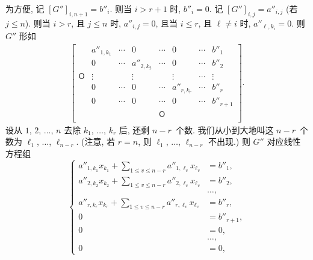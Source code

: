 \documentclass[../libro.tex]{subfiles}
\begin{document}
为方便, 记 \([G'']_{i,n+1} = b''_i\).
则当 \(i > r + 1\) 时, \(b''_i = 0\).
记 \([G'']_{i,j} = a''_{i,j}\)
(若 \(j \leq n\)).
则当 \(i > r\), 且 \(j \leq n\) 时,
\(a''_{i,j} = 0\),
且当 \(i \leq r\), 且 \(\ell \neq i\) 时,
\(a''_{\ell,k_i} = 0\).
则 \(G''\) 形如
\begin{align*}
    \begin{bmatrix}
        {}         & a''_{1,k_1} & \cdots & 0           & \cdots     & 0           & \cdots & b''_1     \\
        {}         & 0           & \cdots & a''_{2,k_2} & \cdots     & 0           & \cdots & b''_2     \\
        \mathsf{O} & \vdots      & {}     & \vdots      & {}         & \vdots      & \cdots & \vdots    \\
        {}         & 0           & \cdots & 0           & \cdots     & a''_{r,k_r} & \cdots & b''_r     \\
        {}         & 0           & \cdots & 0           & \cdots     & 0           & \cdots & b''_{r+1} \\
        {}         & {}          & {}     & {}          & \mathsf{O} & {}          & {}     & {}        \\
    \end{bmatrix}.
\end{align*}
设从 \(1\), \(2\), \(\dots\), \(n\)
去除 \(k_1\), \(\dots\), \(k_r\) 后,
还剩 \(n - r\)~个数.
我们从小到大地叫这 \(n - r\)~个数为
\(\ell_1\), \(\dots\), \(\ell_{n-r}\).
(注意, 若 \(r = n\), 则
    \(\ell_1\), \(\dots\), \(\ell_{n-r}\)
不出现.)
则 \(G''\) 对应线性方程组
\begin{equation}
    \left\{ %
    \begin{aligned}
        a''_{1,k_1} x_{k_1} + \sum_{1 \leq v \leq n-r} {a''_{1,\ell_v} x_{\ell_v}} & = b''_1,     \\
        a''_{2,k_2} x_{k_2} + \sum_{1 \leq v \leq n-r} {a''_{2,\ell_v} x_{\ell_v}} & = b''_2,     \\
        & \dots, \\
        a''_{r,k_r} x_{k_r} + \sum_{1 \leq v \leq n-r} {a''_{r,\ell_v} x_{\ell_v}} & = b''_r,     \\
        0                                                                          & = b''_{r+1}, \\
        0                                                                          & = 0,         \\
        & \dots, \\
        0                                                                          & = 0,
    \end{aligned}
    \right. %
    \label{eq:sole-9}
\end{equation}
\end{document}
